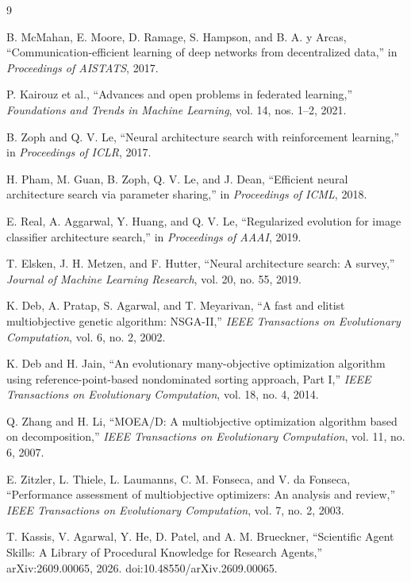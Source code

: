 \documentclass[11pt]{article}
\begin{document}
\begin{thebibliography}{9}

B. McMahan, E. Moore, D. Ramage, S. Hampson, and B. A. y Arcas,
``Communication-efficient learning of deep networks from decentralized data,''
in \emph{Proceedings of AISTATS}, 2017.

P. Kairouz et al.,
``Advances and open problems in federated learning,''
\emph{Foundations and Trends in Machine Learning}, vol. 14, nos. 1--2, 2021.

B. Zoph and Q. V. Le,
``Neural architecture search with reinforcement learning,''
in \emph{Proceedings of ICLR}, 2017.

H. Pham, M. Guan, B. Zoph, Q. V. Le, and J. Dean,
``Efficient neural architecture search via parameter sharing,''
in \emph{Proceedings of ICML}, 2018.

E. Real, A. Aggarwal, Y. Huang, and Q. V. Le,
``Regularized evolution for image classifier architecture search,''
in \emph{Proceedings of AAAI}, 2019.

T. Elsken, J. H. Metzen, and F. Hutter,
``Neural architecture search: A survey,''
\emph{Journal of Machine Learning Research}, vol. 20, no. 55, 2019.

K. Deb, A. Pratap, S. Agarwal, and T. Meyarivan,
``A fast and elitist multiobjective genetic algorithm: NSGA-II,''
\emph{IEEE Transactions on Evolutionary Computation}, vol. 6, no. 2, 2002.

K. Deb and H. Jain,
``An evolutionary many-objective optimization algorithm using reference-point-based nondominated sorting approach, Part I,''
\emph{IEEE Transactions on Evolutionary Computation}, vol. 18, no. 4, 2014.

Q. Zhang and H. Li,
``MOEA/D: A multiobjective optimization algorithm based on decomposition,''
\emph{IEEE Transactions on Evolutionary Computation}, vol. 11, no. 6, 2007.

E. Zitzler, L. Thiele, L. Laumanns, C. M. Fonseca, and V. da Fonseca,
``Performance assessment of multiobjective optimizers: An analysis and review,''
\emph{IEEE Transactions on Evolutionary Computation}, vol. 7, no. 2, 2003.

T. Kassis, V. Agarwal, Y. He, D. Patel, and A. M. Brueckner,
``Scientific Agent Skills: A Library of Procedural Knowledge for Research Agents,''
arXiv:2609.00065, 2026. doi:10.48550/arXiv.2609.00065.


\end{thebibliography}
\end{document}
